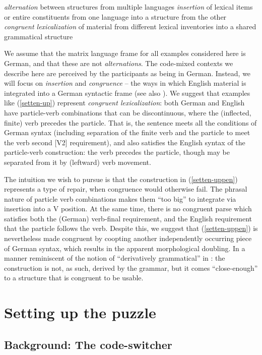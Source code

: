 \documentclass[output=paper]{langscibook}
\begin{document}
\ea\label{muyskentypes}
\ea \textit{alternation} between structures from multiple languages
\ex \textit{insertion} of lexical items or entire constituents from one language into a structure from the other
\ex \textit{congruent lexicalization} of material from different lexical inventories into a shared grammatical structure
\z
\z

We assume that the matrix language frame for all examples considered here is German, and that these are not \textit{alternations}. The code-mixed contexts we describe here are perceived by the participants as being in German. Instead, we will focus on \textit{insertion} and \textit{congruence} -- the ways in which English material is integrated into a German syntactic frame (see also \citealp{myersscotton93}). We suggest that examples like (\ref{setten-up}) represent \textit{congruent lexicalization}: both German and English have particle-verb combinations that can be discontinuous, where the (inflected, finite) verb precedes the particle. That is, the sentence meets all the conditions of German syntax (including separation of the finite verb and the particle to meet the verb second [V2] requirement), and also satisfies the English syntax of the particle-verb construction: the verb precedes the particle, though may be separated from it by (leftward) verb movement.

The intuition we wish to pursue is that the construction in (\ref{setten-uppen}) represents a type of repair, when congruence would otherwise fail. The phrasal nature of particle verb combinations makes them ``too big'' to integrate via insertion into a V position. At the same time, there is no congruent parse which satisfies both the (German) verb-final requirement, and the English requirement that the particle follows the verb. Despite this, we suggest that (\ref{setten-uppen}) is nevertheless made congruent by coopting another independently occurring piece of German syntax, which results in the apparent morphological doubling. In a manner reminiscent of the notion of ``derivatively grammatical'' in \citet[242]{chomsky65}: the construction is not, as such, derived by the grammar, but it comes ``close-enough'' to a structure that is congruent to be usable.

 

\section{Setting up the puzzle}\largerpage

\subsection{Background: The code-switcher}
\end{document}
